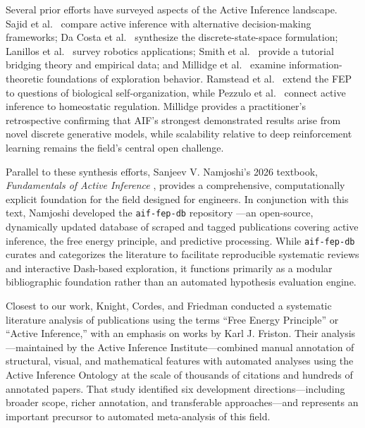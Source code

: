 \documentclass[
  english,
]{article}
\begin{document}
Several prior efforts have surveyed aspects of the Active Inference
landscape. Sajid et al.~\citep{sajid2021active} compare active inference
with alternative decision-making frameworks; Da Costa et
al.~\citep{dacosta2020active} synthesize the discrete-state-space
formulation; Lanillos et al.~\citep{lanillos2021active} survey robotics
applications; Smith et al.~\citep{smith2021computational} provide a
tutorial bridging theory and empirical data; and Millidge et
al.~\citep{millidge2021understanding} examine information-theoretic
foundations of exploration behavior. Ramstead et
al.~\citep{ramstead2018answering} extend the FEP to questions of
biological self-organization, while Pezzulo et
al.~\citep{pezzulo2015active} connect active inference to homeostatic
regulation. Millidge \citep{millidge2024retrospective} provides a
practitioner's retrospective confirming that AIF's strongest
demonstrated results arise from novel discrete generative models, while
scalability relative to deep reinforcement learning remains the field's
central open challenge.

Parallel to these synthesis efforts, Sanjeev V. Namjoshi's 2026
textbook, \emph{Fundamentals of Active Inference}
\citep{namjoshi2026fundamentals}, provides a comprehensive,
computationally explicit foundation for the field designed for
engineers. In conjunction with this text, Namjoshi developed the
\texttt{aif-fep-db} repository \citep{namjoshi2026aiffepdb}---an
open-source, dynamically updated database of scraped and tagged
publications covering active inference, the free energy principle, and
predictive processing. While \texttt{aif-fep-db} curates and categorizes
the literature to facilitate reproducible systematic reviews and
interactive Dash-based exploration, it functions primarily as a modular
bibliographic foundation rather than an automated hypothesis evaluation
engine.

Closest to our work, Knight, Cordes, and Friedman \citep{knight2022fep}
conducted a systematic literature analysis of publications using the
terms ``Free Energy Principle'' or ``Active Inference,'' with an
emphasis on works by Karl J. Friston. Their analysis---maintained by the
Active Inference Institute---combined manual annotation of structural,
visual, and mathematical features with automated analyses using the
Active Inference Ontology at the scale of thousands of citations and
hundreds of annotated papers. That study identified six development
directions---including broader scope, richer annotation, and
transferable approaches---and represents an important precursor to
automated meta-analysis of this field.
\end{document}
